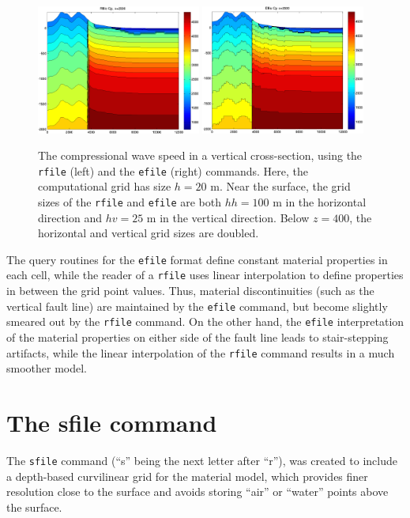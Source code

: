 \documentclass[11pt]{report}
\begin{document}
\begin{figure}
\begin{centering}
  \includegraphics[width=0.48\textwidth]{figures/rfile-cp-x.png}\hfill
\includegraphics[width=0.48\textwidth]{figures/efile-cp-x.png}\\
  \caption{The compressional wave speed in a vertical cross-section, using the {\tt rfile} (left) and the {\tt efile} (right) commands. Here,
    the computational grid has size $h=20$ m. Near the surface, the grid sizes of the {\tt rfile}
  and {\tt efile} are both $hh=100$ m in the horizontal direction and $hv=25$ m in the vertical
  direction. Below $z=400$, the horizontal and vertical grid sizes are doubled.}
  \label{fig:rfile-efile-2}
\end{centering}
\end{figure}
The query routines for the {\tt efile} format define constant material properties in each cell,
while the reader of a {\tt rfile} uses linear interpolation to define properties in between the grid
point values. Thus, material discontinuities (such as the vertical fault line) are maintained by 
the {\tt efile} command, but become slightly smeared out by the {\tt rfile} command. On the other
hand, the {\tt efile} interpretation of the material properties on either side of the fault line
leads to stair-stepping artifacts, while the linear interpolation of the {\tt rfile} command results
in a much smoother model.

\section{The sfile command} \label{sec:sfile-mat}
The \verb+sfile+ command (``s'' being the next letter after ``r''), was
  created to include a depth-based curvilinear grid for the material model,
  which provides finer resolution close to the surface and avoids storing
  ``air'' or ``water'' points above the surface.
\end{document}
